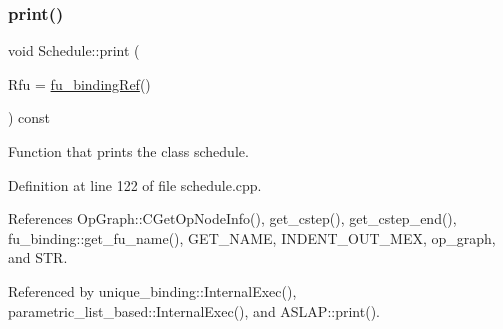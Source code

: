 \subsubsection{\texorpdfstring{print()}{print()}}
{\footnotesize\ttfamily void Schedule\+::print (\begin{DoxyParamCaption}\item[{\hyperlink{fu__binding_8hpp_a619181df8ab98d7b7e17de58ac44b065}{fu\+\_\+binding\+Ref}}]{Rfu = {\ttfamily \hyperlink{fu__binding_8hpp_a619181df8ab98d7b7e17de58ac44b065}{fu\+\_\+binding\+Ref}()} }\end{DoxyParamCaption}) const}



Function that prints the class schedule. 



Definition at line 122 of file schedule.\+cpp.



References Op\+Graph\+::\+C\+Get\+Op\+Node\+Info(), get\+\_\+cstep(), get\+\_\+cstep\+\_\+end(), fu\+\_\+binding\+::get\+\_\+fu\+\_\+name(), G\+E\+T\+\_\+\+N\+A\+ME, I\+N\+D\+E\+N\+T\+\_\+\+O\+U\+T\+\_\+\+M\+EX, op\+\_\+graph, and S\+TR.



Referenced by unique\+\_\+binding\+::\+Internal\+Exec(), parametric\+\_\+list\+\_\+based\+::\+Internal\+Exec(), and A\+S\+L\+A\+P\+::print().

